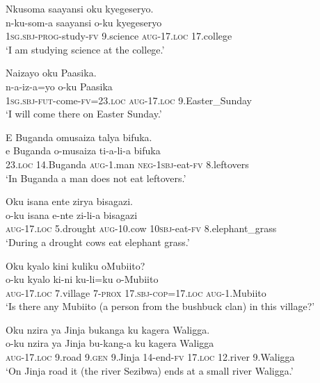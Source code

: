 \ea \label{ex-syntax-clauseadj}
\begin{xlist}	
\ex   \label{ex-syntax-clause-adj2}
    \glll    Nkusoma saayansi oku kyegeseryo.\\
     n-ku-som-a saayansi o-ku kyegeseryo\\
\textsc{1sg.sbj}-\textsc{prog}-study-\textsc{fv} 9.science \textsc{aug}-\textsc{17.loc} 17.college\\
    \glt  `I am studying science at the college.’

\ex   \label{ex-syntax-clause-adj3}
    \glll   Naizayo oku Paasika.\\
     n-a-iz-a=yo o-ku Paasika\\
	\textsc{1sg.sbj}-\textsc{fut}-come-\textsc{fv}=23.\textsc{loc} \textsc{aug}-17.\textsc{loc} 9.Easter\_Sunday\\
    \glt  `I will come there on Easter Sunday.’
\end{xlist}	
\z

\largerpage
\ea \label{ex-syntax-clause-adj-initial}
\begin{xlist}	
\ex   \label{ex-syntax-clause-adjinitial1}
    \glll    E Buganda omusaiza talya bifuka.\\
     e Buganda o-musaiza ti-a-li-a bifuka\\
\textsc{23.loc} 14.Buganda \textsc{aug}-1.man \textsc{neg}-\textsc{1sbj}-eat-\textsc{fv} 8.leftovers\\
    \glt   `In Buganda a man does not eat leftovers.’

\ex   \label{ex-syntax-clause-adjinitial2}
    \glll    Oku isana ente zirya bisagazi.\\
    o-ku isana e-nte zi-li-a bisagazi\\
\textsc{aug}-\textsc{17.loc} 5.drought  \textsc{aug}-10.cow 10\textsc{sbj}-eat-\textsc{fv} 8.elephant\_grass\\
    \glt `During a drought cows eat elephant grass.’	
 
\ex   \label{ex-syntax-clause-adjinitial4}
    \glll   Oku kyalo kini kuliku oMubiito?\\
     o-ku kyalo ki-ni ku-li=ku o-Mubiito\\
	\textsc{aug}-\textsc{17.loc} 7.village 7-\textsc{prox} 17.\textsc{sbj}-\textsc{cop}=\textsc{17.loc} \textsc{aug}-1.Mubiito\\
    \glt  `Is there any Mubiito (a person from the bushbuck clan)  in this village?’

\ex   \label{ex-syntax-clause-adjinitial3}
    \glll   Oku nzira ya Jinja bukanga ku kagera Waligga.\\
   o-ku nzira ya Jinja bu-kang-a ku kagera Waligga\\
	\textsc{aug}-\textsc{17.loc} 9.road \textsc{9.gen} 9.Jinja 14-end-\textsc{fv} \textsc{17.loc} 12.river 9.Waligga\\
    \glt  `On Jinja road it (the river Sezibwa) ends at a small river Waligga.’
        	
\end{xlist}	
\z

